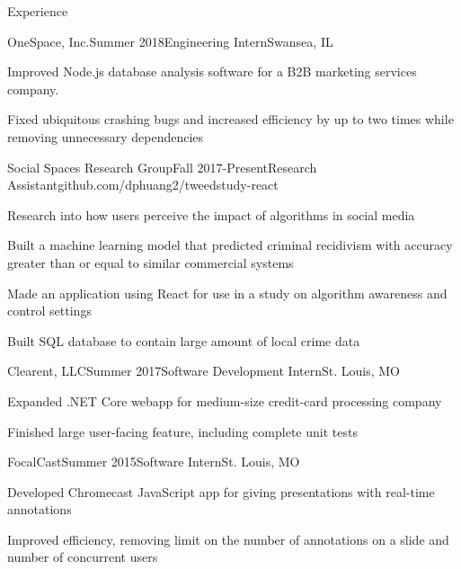 \documentclass{resume} %
\begin{document}
            \begin{rSection}{Experience}
                \begin{rSubsection}{OneSpace, Inc.}{Summer 2018}{Engineering Intern}{Swansea, IL} 
                \item Improved Node.js database analysis software for a B2B marketing services company. 
                \item Fixed ubiquitous crashing bugs and increased efficiency by up to two times while removing unnecessary dependencies
                \end{rSubsection}

                \begin{rSubsection}{Social Spaces Research Group}{Fall 2017-Present}{Research Assistant}{github.com/dphuang2/tweedstudy-react}{}
                \item Research into how users perceive the impact of algorithms in social media
                \item Built a machine learning model that predicted criminal recidivism with accuracy greater than or equal to similar commercial systems
                \item Made an application using React for use in a study on algorithm awareness and control settings
                \item Built SQL database to contain large amount of local crime data
                \end{rSubsection}

                \begin{rSubsection}{Clearent, LLC}{Summer 2017}{Software Development Intern}{St. Louis, MO}
                \item Expanded .NET Core webapp for medium-size credit-card processing company
                \item Finished large user-facing feature, including complete unit tests
                \end{rSubsection}

                \begin{rSubsection}{FocalCast}{Summer 2015}{Software Intern}{St. Louis, MO}{}
                \item Developed Chromecast JavaScript app for giving presentations with real-time annotations
                \item Improved efficiency, removing limit on the number of annotations on a slide and number of concurrent users
                \end{rSubsection}

            \end{rSection}
\end{document}
